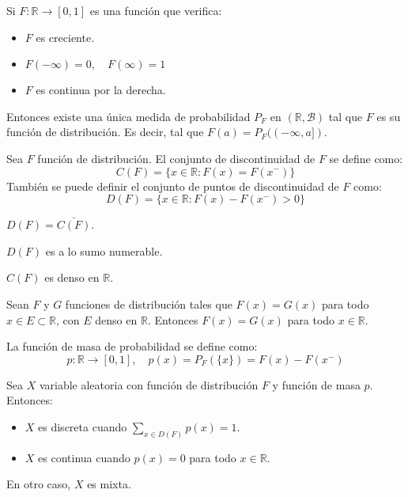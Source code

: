 \begin{theorem}
    Si $F: \mathbb{R} \to [0, 1]$ es una función que verifica:
    \begin{itemize}
        \item $F$ es creciente.
        \item $F(-\infty) = 0, \quad F(\infty) = 1$
        \item $F$ es continua por la derecha.
    \end{itemize}
    Entonces existe una única medida de probabilidad $P_F$ en $(\mathbb{R}, \mathcal{B})$ tal que $F$ es su función de distribución.
    Es decir, tal que $F(a) = P_F((-\infty, a])$.
\end{theorem}

\begin{definition}
    Sea $F$ función de distribución.
    El conjunto de discontinuidad de $F$ se define como:
    $$C(F) = \{ x \in \mathbb{R} : F(x) = F(x^-) \}$$
    También se puede definir el conjunto de puntos de discontinuidad de $F$ como:
    $$D(F) = \{ x \in \mathbb{R} : F(x) - F(x^-) > 0 \}$$
\end{definition}

\begin{remark}
    $D(F) = \bar{C(F)}$.
\end{remark}

\begin{proposition}
    $D(F)$ es a lo sumo numerable.
\end{proposition}

\begin{corollary}
    $C(F)$ es denso en $\mathbb{R}$.
\end{corollary}

\begin{proposition}
    Sean $F$ y $G$ funciones de distribución tales que $F(x) = G(x)$ para todo $x \in E \subset \mathbb{R}$, con $E$ denso en $\mathbb{R}$.
    Entonces $F(x) = G(x)$ para todo $x \in \mathbb{R}$.
\end{proposition}

\begin{definition}
    La función de masa de probabilidad se define como:
    $$p : \mathbb{R} \to [0, 1], \quad p(x) = P_F(\{x\}) = F(x) - F(x^-)$$
\end{definition}

\begin{definition}
    Sea $X$ variable aleatoria con función de distribución $F$ y función de masa $p$.
    Entonces:
    \begin{itemize}
        \item $X$ es discreta cuando $\sum_{x \in D(F)} p(x) = 1$.
        \item $X$ es continua cuando $p(x) = 0$ para todo $x \in \mathbb{R}$.
    \end{itemize}
    En otro caso, $X$ es mixta.
\end{definition}

